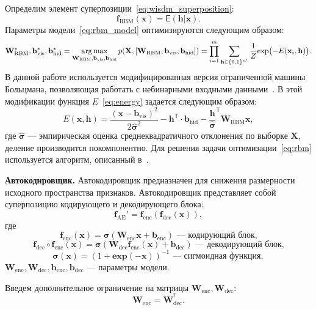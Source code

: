 Определим элемент суперпозиции~\eqref{eq:wisdm_superposition}: 
\begin{equation}
\label{eq:rbm_model}
\mathbf{f}_\text{RBM}(\mathbf{x}) = \mathsf{E}(\mathbf{h}|\mathbf{x}).
\end{equation}
Параметры модели~\eqref{eq:rbm_model} оптимизируются следующим образом:
\begin{equation}
\label{eq:rbm}
{\mathbf{W}}^{*}_\text{RBM},{\mathbf{b}}^{*}_\text{vis}, {\mathbf{b}}^{*}_\text{hid} = \operatorname*{arg\,max}_{{\mathbf{W}_\text{RBM}},{\mathbf{b}}_\text{vis}, {\mathbf{b}}_\text{hid} } p(\mathbf{X}, [{\mathbf{W}_\text{RBM}},{\mathbf{b}}_\text{vis}, {\mathbf{b}}_\text{hid}]) = \prod_{i=1}^m \sum_{\mathbf{h}\in \{0,1\}^{n'}} \frac{1}{Z} \text{exp}\bigl(-E(\mathbf{\mathbf{x}}_i,\mathbf{h)}\bigr).
\end{equation}
В данной работе используется модифицированная версия ограниченной машины Больцмана, позволяющая работать с небинарными входными данными~\cite{gbrbm}. В этой модификации функция $E$~\eqref{eq:energy} задается следующим образом:
\[
E(\mathbf{x},\mathbf{h}) = \frac{(\mathbf{x} - \mathbf{b}_\text{vis})^2}{2\hat{\boldsymbol{\sigma}}^2} -\mathbf{h}^\mathsf{T} \cdot \mathbf{b}_\text{hid} - \frac{\mathbf{h}}{\hat{\boldsymbol{\sigma}}}^\mathsf{T}\mathbf{W}_\text{RBM}\mathbf{x},
\]
где $\hat{\boldsymbol{\sigma}}$ --- эмпирическая оценка среднеквадратичного отклонения по выборке $\mathbf{X}$, деление производится покомпонентно. 
Для решения задачи оптимизации~\eqref{eq:rbm} используется алгоритм, описанный в~\cite{hinton_rbm}.

\textbf{Автокодировщик.}
Автокодировщик предназначен для снижения размерности исходного пространства признаков.
Автокодировщик представляет собой суперпозицию кодирующего и декодирующего блока:
\[
 \mathbf{f}_\text{AE}' = \mathbf{f}_\text{enc}(\mathbf{f}_\text{dec}(\mathbf{x})),
\]
где $$ \mathbf{f}_\text{enc}(\mathbf{x}) = \boldsymbol{\sigma}(\mathbf{W}_\text{enc}\mathbf{x}+\mathbf{b}_\text{enc}) \text{ --- кодирующий блок,}$$
$$  \mathbf{f}_\text{dec} \circ \mathbf{f}_\text{enc}(\mathbf{x}) = \boldsymbol{\sigma}(\mathbf{W}_\text{dec}\mathbf{f}_\text{enc}(\mathbf{x})+\mathbf{b}_\text{dec})\text{ --- декодирующий блок,}$$ $$\boldsymbol{\sigma}(\mathbf{x}) = (1+\textbf{exp}({-\mathbf{x}}))^{-1} \text{ --- сигмоидная функция},$$ $\mathbf{W}_\text{enc},\mathbf{W}_\text{dec},\mathbf{b}_\text{enc}, \mathbf{b}_\text{dec}$ --- параметры модели.

Введем дополнительное ограничение на матрицы $\mathbf{W}_\text{enc}, \mathbf{W}_\text{dec}$:
\[
 \mathbf{W}_\text{enc} = \mathbf{W}_\text{dec}^{^\mathsf{T}}.
\]

